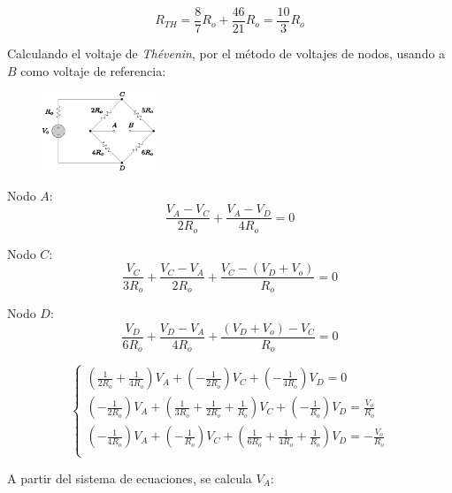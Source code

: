 \documentclass[letter,11pt]{article}
\begin{document}
\begin{enumerate}
\begin{equation*}
    R_{TH} = \frac{8}{7}R_o + \frac{46}{21}R_o = \frac{10}{3}R_o
\end{equation*}
\vspace{0.4cm}

Calculando el voltaje de \emph{Thévenin}, por el método de voltajes de nodos,
usando a $B$ como voltaje de referencia:

\begin{figure}[!h]
\centering
\includegraphics[width=0.30\textwidth]{resources/figura8.eps}
\end{figure}

Nodo $A$:
\begin{equation*}
    \frac{V_A-V_C}{2R_o} + \frac{V_A-V_D}{4R_o} = 0
\end{equation*}

Nodo $C$:
\begin{equation*}
    \frac{V_C}{3R_o} + \frac{V_C-V_A}{2R_o} + \frac{V_C-(V_D+V_o)}{R_o} = 0
\end{equation*}

Nodo $D$:
\begin{equation*}
    \frac{V_D}{6R_o} + \frac{V_D-V_A}{4R_o} + \frac{(V_D+V_o)-V_C}{R_o} = 0
\end{equation*}

\begin{equation*}
    \begin{cases}
        (\frac{1}{2R_o} + \frac{1}{4R_o})V_A +
        (-\frac{1}{2R_o})V_C + (-\frac{1}{4R_o})V_D = 0 \\
        (-\frac{1}{2R_o})V_A +
        (\frac{1}{3R_o} + \frac{1}{2R_o} + \frac{1}{R_o})V_C +
        (-\frac{1}{R_o})V_D = \frac{V_o}{R_o} \\
        (-\frac{1}{4R_o})V_A + (-\frac{1}{R_o})V_C +
        (\frac{1}{6R_o} + \frac{1}{4R_o} +
        \frac{1}{R_o})V_D = -\frac{V_o}{R_o} \\
    \end{cases}
\end{equation*}

A partir del sistema de ecuaciones, se calcula $V_A$:


\end{enumerate}
\end{document}
